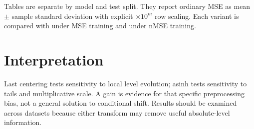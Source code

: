 \documentclass[10pt]{article}
\begin{document}
Tables are separate by model and test split.  They report ordinary MSE as mean
$\pm$ sample standard deviation with explicit $\times10^m$ row scaling. Each
variant is compared with  under MSE training and
 under nMSE training.

\section{Interpretation}
Last centering tests sensitivity to local level evolution; asinh tests
sensitivity to tails and multiplicative scale.  A gain is evidence for that
specific preprocessing bias, not a general solution to conditional shift.
Results should be examined across datasets because either transform may remove
useful absolute-level information.
\end{document}
